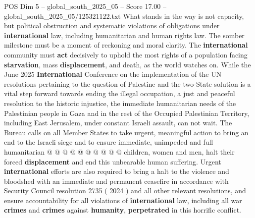 \begin{textsample}{POS Dim 5 – global\_south\_2025\_05 – Score 17.00 – global\_south\_2025\_05/125321122.txt}
What stands in the way is not capacity, but political obstruction and systematic violations of obligations under \textbf{international} law, including humanitarian and human rights law.
The somber milestone must be a moment of reckoning and moral clarity.
The \textbf{international} community must \textbf{act} decisively to uphold the most rights of a population facing \textbf{starvation}, mass \textbf{displacement}, and death, as the world watches on.
While the June 2025 \textbf{International} Conference on the implementation of the UN resolutions pertaining to the question of Palestine and the two-State solution is a vital step forward towards ending the illegal occupation, a just and peaceful resolution to the historic injustice, the immediate humanitarian needs of the Palestinian people in Gaza and in the rest of the Occupied Palestinian Territory, including East Jerusalem, under constant Israeli assault, can not wait.
The Bureau calls on all Member States to take urgent, meaningful action to bring an end to the Israeli siege and to ensure immediate, unimpeded and full humanitarian @ @ @ @ @ @ @ @ @ @ children, women and men, halt their forced \textbf{displacement} and end this unbearable human suffering.
Urgent \textbf{international} efforts are also required to bring a halt to the violence and bloodshed with an immediate and permanent ceasefire in accordance with Security Council resolution 2735 ( 2024 ) and all other relevant resolutions, and ensure accountability for all violations of \textbf{international} law, including all war \textbf{crimes} and \textbf{crimes} against \textbf{humanity}, \textbf{perpetrated} in this horrific conflict.

\end{textsample}
